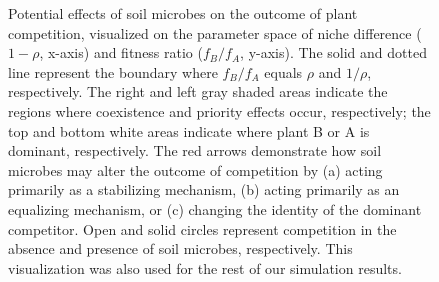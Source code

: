 \clearpage
\begin{figure}[h!]
	\centering
	\caption[Potential effects of soil microbes on the outcome of plant competition, visualized on the parameter space of niche difference and fitness ratio.]
		{\hspace{1mm}Potential effects of soil microbes on the outcome of plant competition, visualized on the parameter space of niche difference ($1 - \rho$, x-axis) and fitness ratio ($f_{B}/f_{A}$, y-axis). The solid and dotted line represent the boundary where $f_{B}/f_{A}$ equals $\rho$ and $1/\rho$, respectively. The right and left gray shaded areas indicate the regions where coexistence and priority effects occur, respectively; the top and bottom white areas indicate where plant B or A is dominant, respectively. The red arrows demonstrate how soil microbes may alter the outcome of competition by (a) acting primarily as a stabilizing mechanism, (b) acting primarily as an equalizing mechanism, or (c) changing the identity of the dominant competitor. Open and solid circles represent competition in the absence and presence of soil microbes, respectively. This visualization was also used for the rest of our simulation results.}
	\label{fig:PopChessonSpace}
\end{figure}



